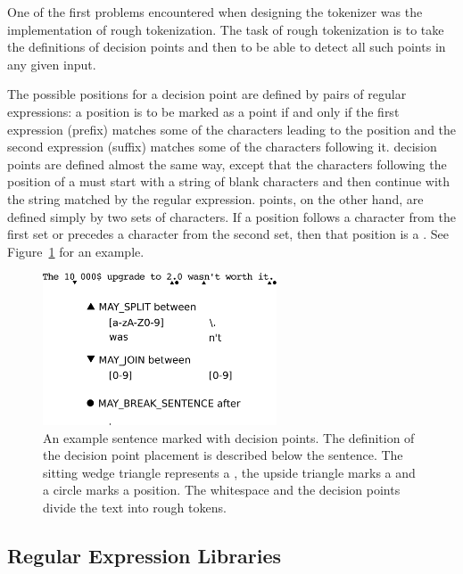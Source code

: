 One of the first problems encountered when designing the tokenizer was the
implementation of rough tokenization. The task of rough tokenization is to take
the definitions of decision points and then to be able to detect all such points
in any given input.

The possible positions for a \maysplit{} decision point are defined by pairs of
regular expressions: a position is to be marked as a \maysplit{} point if and
only if the first expression (prefix) matches some of the characters
leading to the position and the second expression (suffix) matches some of
the characters following it. \mayjoin{} decision points are defined almost the
same way, except that the characters following the position of a \mayjoin{}
must start with a string of blank characters and then continue with the string
matched by the regular expression. \maybreaksentence{} points, on the other
hand, are defined simply by two sets of characters. If a position follows a
character from the first set or precedes a character from the second set, then
that position is a \maybreaksentence{}. See Figure~\ref{fig:decision-points} for an example.

\begin{figure}
  \includegraphics[width=0.618033988\textwidth]{img/decisionpoints.eps}
  \caption{An example sentence marked with decision points. The definition of
           the decision point placement is described below the sentence. The
           sitting wedge triangle represents a \maysplit{}, the upside triangle
           marks a \mayjoin{} and a circle marks a \maybreaksentence{}
           position. The whitespace and the decision points divide the text
           into rough tokens.}
  \label{fig:decision-points}
\end{figure}


\subsection{Regular Expression Libraries}
\label{ssec:impl-roughtok-regex}

